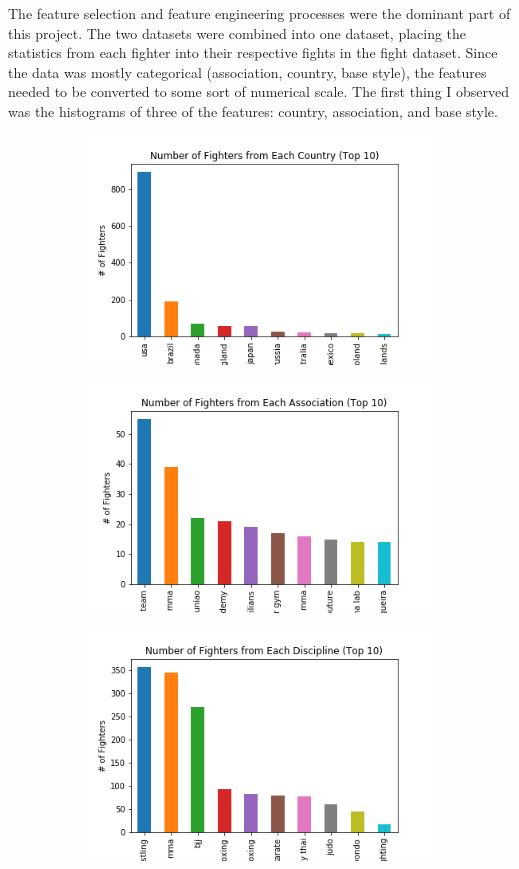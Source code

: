 \documentclass[12pt]{article}
\begin{document}
The feature selection and feature engineering processes were the dominant part of this project. The two datasets were combined into one dataset, placing the statistics from each fighter into their respective fights in the fight dataset. Since the data was mostly categorical (association, country, base style), the features needed to be converted to some sort of numerical scale. The first thing I observed was the histograms of three of the features: country, association, and base style.

\begin{figure}[h!]
\centering
\begin{subfigure}{.5\textwidth}
  \centering
  \includegraphics[width=.85\linewidth]{country_hist.png}
  \label{fig:sub1}
\end{subfigure}%
\begin{subfigure}{.5\textwidth}
  \centering
  \includegraphics[width=.85\linewidth]{gym_hist.png}
  \label{fig:sub2}
\end{subfigure}
\begin{subfigure}{.5\textwidth}
  \centering
  \includegraphics[width=.85\linewidth]{style_hist.png}

\end{subfigure}
\end{figure}
\end{document}
